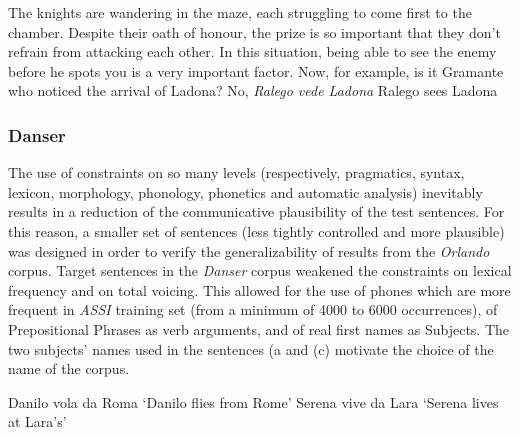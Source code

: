 \eal
\ex The knights are wandering in the maze, each struggling to come first to the chamber. Despite their oath of honour, the prize is so important that they don't refrain from attacking each other. In this situation, being able to see the enemy before he spots you is a very important factor. Now, for example, is it Gramante who noticed the arrival of Ladona?  
\ex No, \textit{Ralego vede Ladona}
\ex Ralego sees Ladona
\zl


\subsubsection{Danser}\label{sec4212}
The use of constraints on so many levels (respectively, pragmatics, syntax, lexicon, morphology, phonology, phonetics and automatic analysis) inevitably results in a reduction of the communicative plausibility of the test sentences. For this reason, a smaller set of sentences (less tightly controlled and more plausible) was designed in order to verify the generalizability of results from the \textit{Orlando} corpus. Target sentences in the \textit{Danser} corpus weakened the constraints on lexical frequency and on total voicing. This allowed for the use of phones which are more frequent in \textit{ASSI} training set (from a minimum of 4000 to 6000 occurrences), of Prepositional Phrases as verb arguments, and of real first names as Subjects. The two subjects' names used in the sentences (a and (c) motivate the choice of the name of the corpus.

\eal
\ex Danilo vola da Roma
\ex `Danilo flies from Rome'
\ex Serena vive da Lara
\ex `Serena lives at Lara's'
\zl


